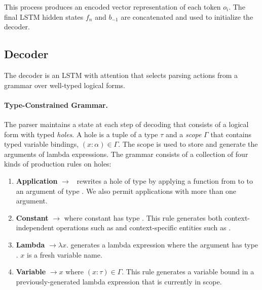 This process produces an encoded vector representation of each token $o_i$. The 
final LSTM hidden states $f_n$ and $b_{-1}$ are concatenated  and used to 
initialize the decoder.

\subsection{Decoder}
\label{sec:nnsp_decoder}

The decoder is an LSTM with attention that selects parsing actions from a 
grammar over well-typed logical forms.

\paragraph{Type-Constrained Grammar.} The parser maintains a state at each step 
of decoding that consists of a logical form with typed \emph{holes}.
A hole is a tuple \hole{\tau}{\Gamma} of a type $\tau$ and a \emph{scope} 
$\Gamma$ that contains typed variable bindings, $(x:\alpha) \in \Gamma$.
The scope is used to store and generate the arguments of lambda expressions. 
The grammar consists of a collection of four kinds of production rules on holes:

\begin{enumerate}
    \item \textbf{Application} 
\hole{\tau}{\Gamma}$\rightarrow$\pred{(}\hole{\func{\beta}{\tau}}{\Gamma}~\hole{\beta}{\Gamma}\pred{)}
rewrites a hole of type \type{\tau} by applying a 
function from \type{\beta} to \type{\tau} to an argument of type \type{\beta}. 
We also permit applications with more than one argument.
    \item \textbf{Constant} \hole{\tau}{\Gamma}$\rightarrow$ where 
constant  has type \type{\tau}. This rule generates both 
context-independent operations such as  and context-specific 
entities such as .
    \item \textbf{Lambda} \hole{\func{\alpha}{\tau}}{\Gamma}$\rightarrow 
\lambda x$.  generates a lambda 
expression where the argument has type \type{\alpha}. $x$ is a fresh variable 
name.
    \item \textbf{Variable} \hole{\tau}{\Gamma}$\rightarrow x$ where $(x : 
\tau) \in \Gamma$. This rule generates a variable bound in a 
previously-generated lambda expression that is currently in scope.
\end{enumerate}

